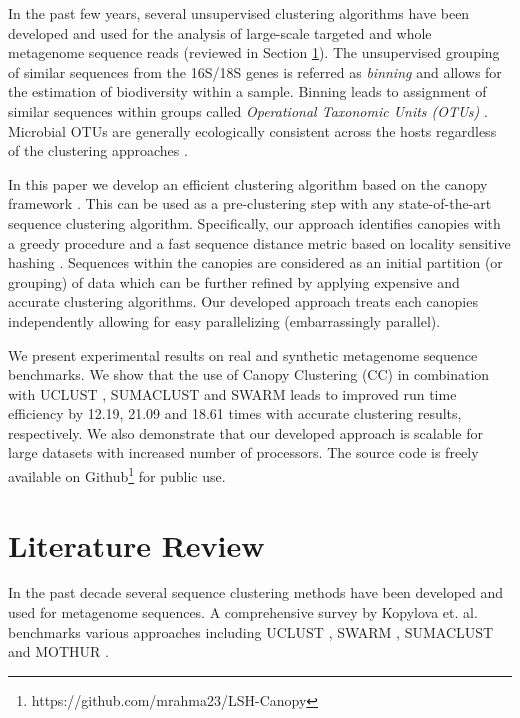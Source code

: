 \documentclass[10pt, conference, compsocconf]{IEEEtran}
\begin{document}
In the past few years, several unsupervised 
clustering algorithms have been developed and
used for the analysis of large-scale targeted and whole 
metagenome sequence reads 
(reviewed in Section \ref{sec:Literature}). The 
unsupervised grouping  of similar sequences from the 
16S/18S genes is referred as \emph{binning} and 
allows for the estimation of biodiversity within a sample. Binning 
leads to assignment of similar sequences within groups called \emph{Operational Taxonomic Units (OTUs)} \cite{MAROTU}. Microbial OTUs are generally 
ecologically consistent across the hosts regardless of the 
clustering approaches \cite{MAROTUConsistant}. 


In this paper we develop an 
efficient clustering algorithm based on  the canopy framework \cite{MARCanopy}. This  can be used as a pre-clustering  
step with any state-of-the-art sequence clustering algorithm. Specifically, 
our approach identifies canopies with a greedy procedure and a 
fast sequence distance metric based on locality 
sensitive hashing \cite{MARLshRef2}. Sequences within the canopies are 
considered as an initial partition (or grouping) of data which can be 
further refined by applying expensive and accurate clustering 
algorithms. Our developed approach treats each canopies independently 
allowing for easy parallelizing (embarrassingly parallel). 

We present experimental results on 
real and synthetic metagenome sequence
benchmarks. We show that the 
use of Canopy Clustering (CC) in combination 
with UCLUST \cite{MARuclust}, SUMACLUST \cite{MARSumaclust} and 
SWARM \cite{MARSwarm2} leads to improved run 
time efficiency by 12.19, 21.09 and 18.61 times with accurate clustering results, respectively. We also demonstrate that our 
developed approach is scalable for large datasets with 
increased number of processors. The 
source code is freely available on Github\footnote{https://github.com/mrahma23/LSH-Canopy} for public use. 

          

\section{Literature Review}
\label{sec:Literature}

In the past decade several 
sequence clustering methods have been developed and
used  for metagenome sequences. A comprehensive survey 
by Kopylova et. al. \cite{MARopenDeNovo} benchmarks 
various  approaches 
including UCLUST \cite{MARuclust}, SWARM \cite{MARSwarm2}, 
SUMACLUST \cite{MARSumaclust} and MOTHUR \cite{MARMothur}. 
\end{document}

